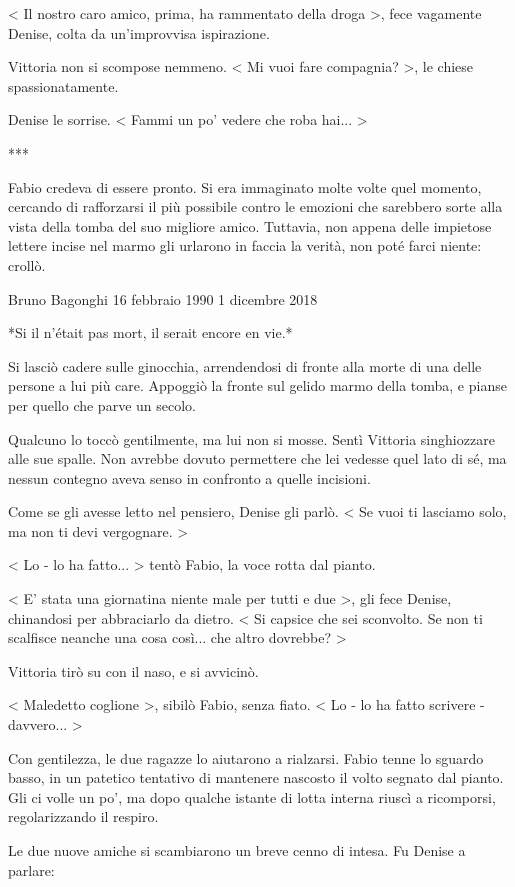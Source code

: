< Il nostro caro amico, prima, ha rammentato della droga >, fece vagamente Denise, colta da un'improvvisa ispirazione.

Vittoria non si scompose nemmeno. < Mi vuoi fare compagnia? >, le chiese spassionatamente.

Denise le sorrise. < Fammi un po' vedere che roba hai... >

***

Fabio credeva di essere pronto. Si era immaginato molte volte quel momento, cercando di rafforzarsi il più possibile contro le emozioni che sarebbero sorte alla vista della tomba del suo migliore amico. Tuttavia, non appena delle impietose lettere incise nel marmo gli urlarono in faccia la verità, non poté farci niente: crollò.

Bruno Bagonghi
16 febbraio 1990
1 dicembre 2018

*Si il n'était pas mort, il serait encore en vie.*

Si lasciò cadere sulle ginocchia, arrendendosi di fronte alla morte di una delle persone a lui più care. Appoggiò la fronte sul gelido marmo della tomba, e pianse per quello che parve un secolo.

Qualcuno lo toccò gentilmente, ma lui non si mosse. Sentì Vittoria singhiozzare alle sue spalle. Non avrebbe dovuto permettere che lei vedesse quel lato di sé, ma nessun contegno aveva senso in confronto a quelle incisioni.

Come se gli avesse letto nel pensiero, Denise gli parlò. < Se vuoi ti lasciamo solo, ma non ti devi vergognare. >

< Lo - lo ha fatto... > tentò Fabio, la voce rotta dal pianto.

< E' stata una giornatina niente male per tutti e due >, gli fece Denise, chinandosi per abbraciarlo da dietro. < Si capsice che sei sconvolto. Se non ti scalfisce neanche una cosa così... che altro dovrebbe? >

Vittoria tirò su con il naso, e si avvicinò.

< Maledetto coglione >, sibilò Fabio, senza fiato. < Lo - lo ha fatto scrivere - davvero... >

Con gentilezza, le due ragazze lo aiutarono a rialzarsi. Fabio tenne lo sguardo basso, in un patetico tentativo di mantenere nascosto il volto segnato dal pianto. Gli ci volle un po', ma dopo qualche istante di lotta interna riuscì a ricomporsi, regolarizzando il respiro.

Le due nuove amiche si scambiarono un breve cenno di intesa. Fu Denise a parlare:

